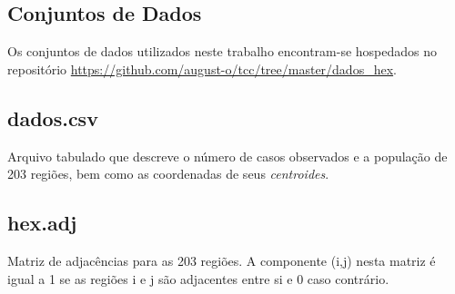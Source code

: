 \documentclass[
	12pt,				%
	openright,			%
	twoside,			%
	a4paper,			%
	english,			%
	french,				%
	spanish,			%
	brazil,				%
	]{abntex2}
\begin{document}
\begin{anexosenv}



\chapter{Conjuntos de Dados}
\label{anex:dados}

Os conjuntos de dados utilizados neste trabalho encontram-se hospedados no repositório \url{https://github.com/august-o/tcc/tree/master/dados_hex}. 

\section{dados.csv}

Arquivo tabulado que descreve o número de casos observados e a população de 203 regiões, bem como as coordenadas de seus \textit{centroides}.

\section{hex.adj}

Matriz de adjacências para as 203 regiões. A componente (i,j) nesta matriz é igual a 1 se as regiões i e j são adjacentes entre si e 0 caso contrário.
\end{anexosenv}


\printindex
\end{document}
